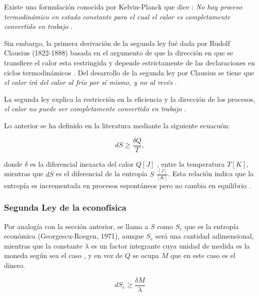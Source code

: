 

Existe una formulación conocida por Kelvin-Planck que dice : \textit{No hay proceso termodinámico en estado constante para el cual el calor es completamente convertido en trabajo} \citep[][pagina 86]{struchtrup}.

Sin embargo, la primera derivación de la segunda ley fué dada por Rudolf Clausius (1822-1888) basada en el argumento de que la dirección en que se transfiere el calor esta restringida y depende estrictamente de las declaraciones en ciclos termodinámicos \citep[][pagina 55]{struchtrup}.  Del desarrollo de la segunda ley por Clausius se tiene que \textit{el calor irá del calor al frío por sí mismo, y no al revés} \citep[][pagina 64]{struchtrup}.

La segunda ley explica la restricción en la eficiencia y la dirección de los procesos, \textit{el calor no puede ser completamente convertido en trabajo} \citep[][pagina 5]{struchtrup}. 

Lo anterior se ha definido en la literatura mediante la siguiente ecuacuón:

\begin{equation}
dS \geqslant \frac{\delta Q}{T},
\end{equation}

donde $\delta$ es la diferencial inexacta del calor $Q [J]$ , entre la temperatura $T [K]$, mientras que $dS$ es el diferencial de la entropía $S$ $\frac{[J]}{[K]}$. Esta relación indica que la entropía es incrementada en procesos espontáneos pero no cambia en equilibrio \citep[][pagina 340]{keszei2011chemical}. 

\subsubsection{Segunda Ley de la econofísica} 

Por analogía con la sección anterior, se llama a $S$ como $S_e$ que es la entropía económica (Georgescu-Roegen, 1971), aunque $S_e$ será una cantidad adimensional, mientras que la constante $\lambda$ es un factor integrante cuya unidad de medida es la moneda según sea el caso \citep[][pagina 166]{richmond} , y en vez de $Q$ se ocupa $M$ que en este caso es el dinero. 

\begin{equation}
dS_e \geqslant \frac{\delta M}{\lambda}
\end{equation}

